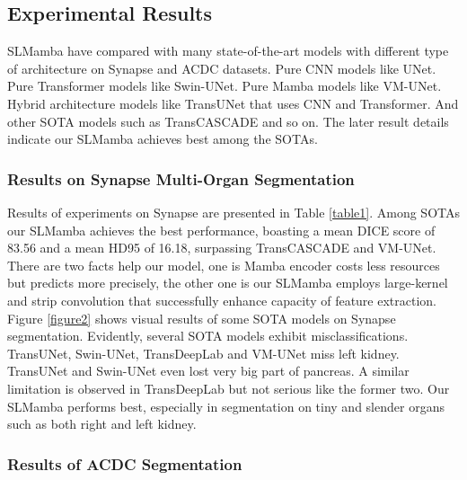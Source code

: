 \documentclass[10pt, a4paper, twocolumn]{article}
\begin{document}
\subsection{Experimental Results}

SLMamba have compared with many state-of-the-art models with different type of architecture on Synapse and ACDC datasets. Pure CNN models like UNet\cite{ronneberger2015unet}. Pure Transformer models like Swin-UNet\cite{cao2021swinunet,cao2023swin}. Pure Mamba models like VM-UNet\cite{ruan2024vmunet}. Hybrid architecture models like TransUNet\cite{chen2021transunet} that uses CNN and Transformer. And other SOTA models such as TransCASCADE\cite{rahman2023transcascade} and so on. The later result details indicate our SLMamba achieves best among the SOTAs.



\subsubsection{Results on Synapse Multi-Organ Segmentation}

Results of experiments on Synapse are presented in Table \textcolor{red}{\ref{table1}}. Among SOTAs our SLMamba achieves the best performance, boasting a mean DICE score of 83.56 and a mean HD95 of 16.18, surpassing TransCASCADE\cite{rahman2023transcascade} and VM-UNet\cite{ruan2024vmunet}. There are two facts help our model, one is Mamba encoder costs less resources but predicts more precisely, the other one is our SLMamba employs large-kernel and strip convolution that successfully enhance capacity of feature extraction. Figure \textcolor{red}{\ref{figure2}} shows visual results of some SOTA models on Synapse segmentation. Evidently, several SOTA models exhibit misclassifications. TransUNet\cite{chen2021transunet}, Swin-UNet\cite{cao2021swinunet}, TransDeepLab\cite{azad2022transdeeplab} and VM-UNet\cite{ruan2024vmunet} miss left kidney. TransUNet\cite{chen2021transunet} and Swin-UNet\cite{cao2021swinunet} even lost very big part of pancreas. A similar limitation is observed in TransDeepLab\cite{azad2022transdeeplab} but not serious like the former two. Our SLMamba performs best, especially in segmentation on tiny and slender organs such as both right and left kidney.




\subsubsection{Results of ACDC Segmentation}
\end{document}
